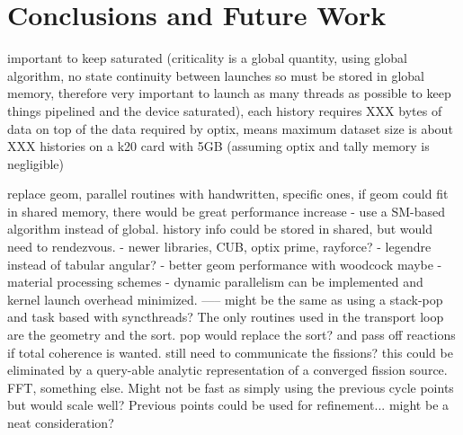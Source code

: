 \chapter{Conclusions and Future Work}
\label{chap:conclusions}

important to keep saturated (criticality is a global quantity, using global algorithm, no state continuity between launches so must be stored in global memory, therefore very important to launch as many threads as possible to keep things pipelined and the device saturated), each history requires XXX bytes of data on top of the data required by optix, means maximum dataset size is about XXX histories on a k20 card with 5GB (assuming optix and tally memory is negligible)


replace geom, parallel routines with handwritten, specific ones, if geom could fit in shared memory, there would be great performance increase
- use a SM-based algorithm instead of global.  history info could be stored in shared, but would need to rendezvous.
- newer libraries, CUB, optix prime, rayforce?
- legendre instead of tabular angular?
- better geom performance with woodcock maybe
- material processing schemes
- dynamic parallelism can be implemented and kernel launch overhead minimized.  
-----  might be the same as using a stack-pop and task based with syncthreads?  The only routines used in the transport loop are the geometry and the sort.   pop would replace the sort?  and pass off reactions if total coherence is wanted.  still need to communicate the fissions?  this could be eliminated by a query-able analytic representation of a converged fission source.  FFT, something else.  Might not be fast as simply using the previous cycle points but would scale well?  Previous points could be used for refinement...  might be a neat consideration?